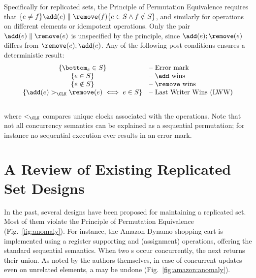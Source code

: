 \documentclass[a4paper]{article}
\begin{document}
Specifically for replicated sets, the Principle of Permutation Equivalence requires that 
 $\{ e \ne f \} \add(e) \parallel \remove(f)  \{ e \in S \land f \notin S \}$, and similarly for operations on different elements or idempotent operations.
Only the pair $\add(e) \parallel \remove(e)$ is unspecified by the
principle, since $\add(e); \remove(e)$ differs from $\remove(e);
\add(e)$.
Any of the following post-conditions ensures a deterministic result:
{\small \[
\begin{array}{@{}cl@{}}
  \{ \bottom_{e} \in S \} &  \text{-- Error mark}\\
  \{ e \in S \} & \text{-- \add wins} \\
  \{ e \notin S \} & \text{-- \remove wins} \\
  \{ \add(e) >_{\CLK} \remove(e) \iff e \in S \} & \text{-- Last
  Writer Wins (LWW)}\\
\end{array}
\] }\\[-1ex]
where $<_{\CLK}$ compares unique clocks associated with the
operations.
Note that not all concurrency semantics can be explained as a sequential
permutation; for instance no sequential execution ever results in an
error mark.






\begin{figure*}[tb]
\begin{minipage}{\textwidth}
\caption{Examples of anomalies and a correct design.}
\label{fig:anomaly}
\end{minipage}
\end{figure*}

\section{A Review of Existing Replicated Set Designs}
\label{sec:anomalies}
In the past, several designs have been proposed for maintaining 
a replicated set.
Most of them violate the Principle of Permutation Equivalence
(Fig.~\ref{fig:anomaly}).
For instance, the Amazon Dynamo shopping cart
\cite{app:rep:optim:1606} is implemented using a register
supporting \Read and \Write (assignment) operations, offering the
standard sequential semantics.
When two \Write{}s occur concurrently, the next \Read returns their
union.
As noted by the authors themselves, in case of concurrent updates even
on unrelated elements, a \remove may be undone
(Fig.~\ref{fig:amazon:anomaly}).
\end{document}
